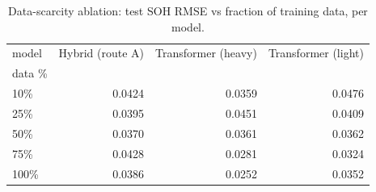 \begin{table}
\caption{Data-scarcity ablation: test SOH RMSE vs fraction of training data, per model.}
\label{tab:ablation_scarcity_test_rmse}
\begin{tabular}{lrrr}
\toprule
model & Hybrid (route A) & Transformer (heavy) & Transformer (light) \\
data \% &  &  &  \\
\midrule
10\% & 0.0424 & 0.0359 & 0.0476 \\
25\% & 0.0395 & 0.0451 & 0.0409 \\
50\% & 0.0370 & 0.0361 & 0.0362 \\
75\% & 0.0428 & 0.0281 & 0.0324 \\
100\% & 0.0386 & 0.0252 & 0.0352 \\
\bottomrule
\end{tabular}
\end{table}
